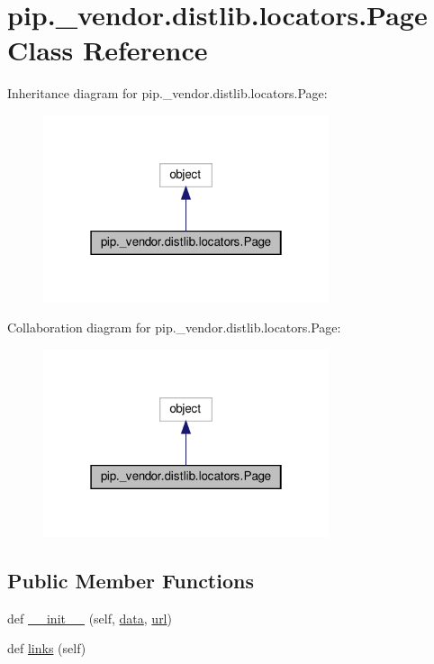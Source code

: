 \hypertarget{classpip_1_1__vendor_1_1distlib_1_1locators_1_1Page}{}\section{pip.\+\_\+vendor.\+distlib.\+locators.\+Page Class Reference}
\label{classpip_1_1__vendor_1_1distlib_1_1locators_1_1Page}


Inheritance diagram for pip.\+\_\+vendor.\+distlib.\+locators.\+Page\+:
\nopagebreak
\begin{figure}[H]
\begin{center}
\leavevmode
\includegraphics[width=238pt]{classpip_1_1__vendor_1_1distlib_1_1locators_1_1Page__inherit__graph}
\end{center}
\end{figure}


Collaboration diagram for pip.\+\_\+vendor.\+distlib.\+locators.\+Page\+:
\nopagebreak
\begin{figure}[H]
\begin{center}
\leavevmode
\includegraphics[width=238pt]{classpip_1_1__vendor_1_1distlib_1_1locators_1_1Page__coll__graph}
\end{center}
\end{figure}
\subsection*{Public Member Functions}
\begin{DoxyCompactItemize}
\item 
def \hyperlink{classpip_1_1__vendor_1_1distlib_1_1locators_1_1Page_a4c70c3a745d73fe0c0dfdde1e3eb37df}{\+\_\+\+\_\+init\+\_\+\+\_\+} (self, \hyperlink{classpip_1_1__vendor_1_1distlib_1_1locators_1_1Page_aeb5908bcd947624f7180e2c25f44ff60}{data}, \hyperlink{classpip_1_1__vendor_1_1distlib_1_1locators_1_1Page_ab937a600f7c2a6e391e9eb00fb700f98}{url})
\item 
def \hyperlink{classpip_1_1__vendor_1_1distlib_1_1locators_1_1Page_a9f601ca69162baf958e39b9b17dabe71}{links} (self)
\end{DoxyCompactItemize}
